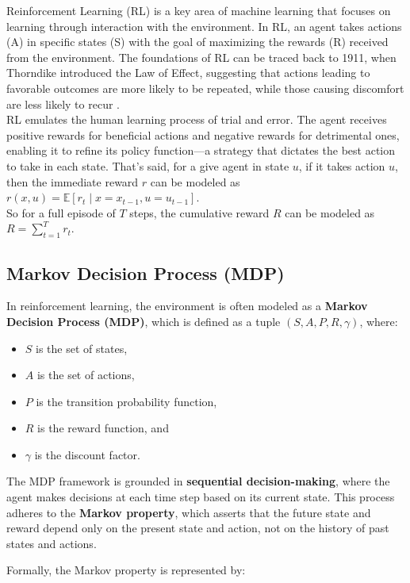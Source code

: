 Reinforcement Learning (RL) is a key area of machine learning that focuses on
learning through interaction with the environment. In RL, an agent takes
actions (A) in specific states (S) with the goal of maximizing the rewards (R)
received from the environment. The foundations of RL can be traced back to
1911, when Thorndike introduced the Law of Effect, suggesting that actions
leading to favorable outcomes are more likely to be repeated, while those
causing discomfort are less likely to recur \cite{bg1}.\\ RL emulates the human
learning process of trial and error. The agent receives positive rewards for
beneficial actions and negative rewards for detrimental ones, enabling it to
refine its policy function—a strategy that dictates the best action to take in
each state. That's said, for a give agent in state $u$, if it takes action $u$,
then the immediate reward $r$ can be modeled as $r(x, u) = \mathbb{E}[r_t \mid
    x=x_{t-1}, u=u_{t-1}]$.\\ So for a full episode of $T$ steps, the cumulative
reward $R$ can be modeled as $R = \sum_{t=1}^{T} r_t$.\\
\subsection{Markov Decision Process (MDP)}

In reinforcement learning, the environment is often modeled as a \textbf{Markov
    Decision Process (MDP)}, which is defined as a tuple $(S, A, P, R, \gamma)$,
where:
\begin{itemize}
    \item \( S \) is the set of states,
    \item \( A \) is the set of actions,
    \item \( P \) is the transition probability function,
    \item \( R \) is the reward function, and
    \item \( \gamma \) is the discount factor.
\end{itemize}

The MDP framework is grounded in \textbf{sequential decision-making}, where the
agent makes decisions at each time step based on its current state. This
process adheres to the \textbf{Markov property}, which asserts that the future
state and reward depend only on the present state and action, not on the
history of past states and actions.

Formally, the Markov property is represented by:

